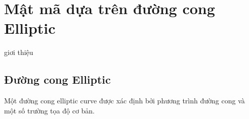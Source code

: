 \documentclass[a4paper,12pt]{report}
\begin{document}
\chapter{Mật mã dựa trên đường cong Elliptic}
 giơi thiệu 
\section{Đường cong Elliptic}
Một đường cong elliptic curve được xác định bởi phương trình đường cong và một số trường tọa độ cơ bản.
\end{document}
